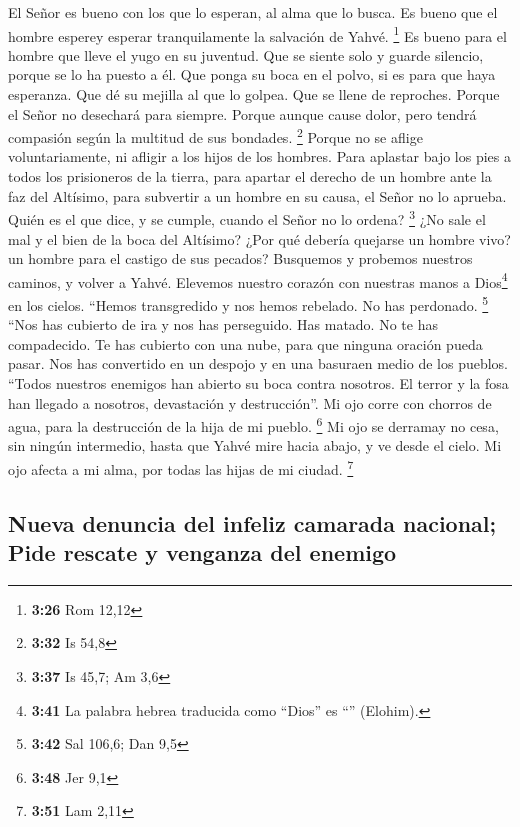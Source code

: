  El Señor es bueno con los que lo esperan, al alma que lo
busca.  Es bueno que el hombre esperey esperar
tranquilamente la salvación de Yahvé. \footnote{\textbf{3:26} Rom 12,12}
 Es bueno para el hombre que lleve el yugo en su
juventud.  Que se siente solo y guarde silencio, porque
se lo ha puesto a él.  Que ponga su boca en el polvo, si
es para que haya esperanza.  Que dé su mejilla al que lo
golpea. Que se llene de reproches.  Porque el Señor no
desechará para siempre.  Porque aunque cause dolor, pero
tendrá compasión según la multitud de sus bondades. \footnote{\textbf{3:32}
  Is 54,8}  Porque no se aflige voluntariamente, ni
afligir a los hijos de los hombres.  Para aplastar bajo
los pies a todos los prisioneros de la tierra,  para
apartar el derecho de un hombre ante la faz del Altísimo,
 para subvertir a un hombre en su causa, el Señor no lo
aprueba.  Quién es el que dice, y se cumple, cuando el
Señor no lo ordena? \footnote{\textbf{3:37} Is 45,7; Am 3,6}
 ¿No sale el mal y el bien de la boca del Altísimo?
 ¿Por qué debería quejarse un hombre vivo? un hombre para
el castigo de sus pecados?  Busquemos y probemos nuestros
caminos, y volver a Yahvé.  Elevemos nuestro corazón con
nuestras manos a Dios\footnote{\textbf{3:41} La palabra hebrea traducida
  como ``Dios'' es ``'' (Elohim).} en los cielos.
 ``Hemos transgredido y nos hemos rebelado. No has
perdonado. \footnote{\textbf{3:42} Sal 106,6; Dan 9,5} 
``Nos has cubierto de ira y nos has perseguido. Has matado. No te has
compadecido.  Te has cubierto con una nube, para que
ninguna oración pueda pasar.  Nos has convertido en un
despojo y en una basuraen medio de los pueblos.  ``Todos
nuestros enemigos han abierto su boca contra nosotros. 
El terror y la fosa han llegado a nosotros, devastación y destrucción''.
 Mi ojo corre con chorros de agua, para la destrucción de
la hija de mi pueblo. \footnote{\textbf{3:48} Jer 9,1} 
Mi ojo se derramay no cesa, sin ningún intermedio,  hasta
que Yahvé mire hacia abajo, y ve desde el cielo.  Mi ojo
afecta a mi alma, por todas las hijas de mi ciudad. \footnote{\textbf{3:51}
  Lam 2,11}

\hypertarget{nueva-denuncia-del-infeliz-camarada-nacional-pide-rescate-y-venganza-del-enemigo}{%
\subsection{Nueva denuncia del infeliz camarada nacional; Pide rescate y
venganza del
enemigo}\label{nueva-denuncia-del-infeliz-camarada-nacional-pide-rescate-y-venganza-del-enemigo}}


